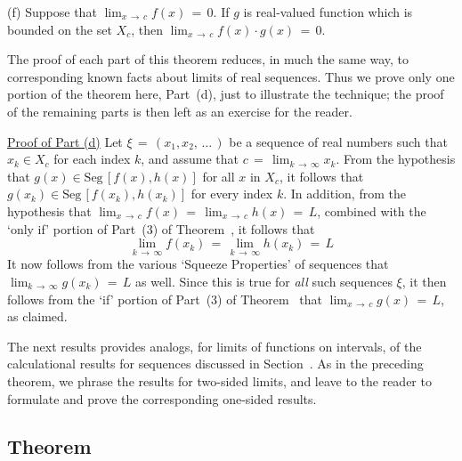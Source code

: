 {\V

        (f) Suppose that ${\displaystyle \lim_{x \,{\rightarrow}\, c} f(x) \,=\, 0}$.
    If $g$ is real-valued function which is bounded on the set $X_{c}$, then ${\displaystyle \lim_{x \,{\rightarrow}\, c} f(x){\cdot}g(x) \,=\, 0}$.

\V

        The proof of each part of this theorem reduces, in much the same way, to corresponding known facts about limits of real sequences.
    Thus we prove only one portion of the theorem here, Part~(d), just to illustrate the technique;
    the proof of the remaining parts is then left as an exercise for the reader.

\V

        \underline{Proof of Part (d)} Let ${\xi} \,=\, (x_{1},x_{2},\,{\ldots}\,)$ be a sequence of real numbers such that $x_{k}{\in}X_{c}$ for each index $k$, and assume that $c \,=\, \lim_{k \,{\rightarrow}\, {\infty}} x_{k}$.
    From the hypothesis that $g(x){\in}\mbox{Seg}\,[f(x),h(x)]$ for all $x$ in $X_{c}$,
    it follows that $g(x_{k}){\in}\mbox{Seg}\,[f(x_{k}),h(x_{k})]$ for every index $k$.
    In addition, from the hypothesis that ${\displaystyle \lim_{x \,{\rightarrow}\, c} f(x) \,=\, \lim_{x \,{\rightarrow}\, c} h(x) \,=\, L}$, 
    combined with the `only if' portion of Part~(3) of Theorem~, it follows that
        \begin{displaymath}
        \lim_{k \,{\rightarrow}\, {\infty}} f(x_{k}) \,=\, \lim_{k \,{\rightarrow}\, {\infty}} h(x_{k}) \,=\, L
        \end{displaymath}
    It now follows from the various `Squeeze Properties' of sequences that $\lim_{k \,{\rightarrow}\, {\infty}} g(x_{k}) \,=\, L$ as well.
    Since this is true for {\em all} such sequences ${\xi}$, it then follows from the `if' portion of Part~(3) of Theorem~ that ${\displaystyle \lim_{x \,{\rightarrow}\, c} g(x) \,=\, L}$, as claimed.

\V

        The next results provides analogs, for limits of functions on intervals, of the calculational results for sequences discussed in Section~.
    As in the preceding theorem, we phrase the results for two-sided limits, and leave to the reader to formulate and prove the corresponding one-sided results.

            \subsection{\small{\bf Theorem}}
            \label{ThmC90.60}
        
}

